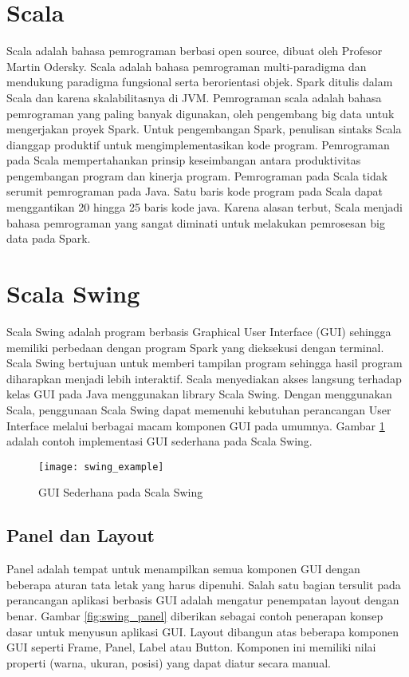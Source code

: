 \section{Scala}
Scala adalah bahasa pemrograman berbasi open source, dibuat oleh Profesor Martin Odersky. Scala adalah bahasa pemrograman multi-paradigma dan mendukung paradigma fungsional serta berorientasi objek. Spark ditulis dalam Scala dan karena skalabilitasnya di JVM. Pemrograman scala adalah bahasa pemrograman yang paling banyak digunakan, oleh pengembang big data untuk mengerjakan proyek Spark. Untuk pengembangan Spark, penulisan sintaks Scala dianggap produktif untuk mengimplementasikan kode program. Pemrograman pada Scala mempertahankan prinsip keseimbangan antara produktivitas pengembangan program dan kinerja program. Pemrograman pada Scala tidak serumit pemrograman pada Java. Satu baris kode program pada Scala dapat menggantikan 20 hingga 25 baris kode java. Karena alasan terbut, Scala menjadi bahasa pemrograman yang sangat diminati untuk melakukan pemrosesan big data pada Spark.



\section{Scala Swing} 
Scala Swing adalah program berbasis Graphical User Interface (GUI) sehingga memiliki perbedaan dengan program Spark yang dieksekusi dengan terminal. Scala Swing bertujuan untuk memberi tampilan program sehingga hasil program diharapkan menjadi lebih interaktif. Scala menyediakan akses langsung terhadap kelas GUI pada Java menggunakan library Scala Swing.  Dengan menggunakan Scala, penggunaan Scala Swing dapat memenuhi kebutuhan perancangan User Interface melalui berbagai macam komponen GUI pada umumnya. Gambar \ref{fig:swing_example} adalah contoh implementasi GUI sederhana pada Scala Swing.

\begin{figure}[H]
	\centering
	\texttt{[image: swing\_example]}
	\caption{GUI Sederhana pada Scala Swing}
	\label{fig:swing_example}
\end{figure}


\subsection{Panel dan Layout}
Panel adalah tempat untuk menampilkan semua komponen GUI dengan beberapa aturan tata letak yang harus dipenuhi. Salah satu bagian tersulit pada perancangan aplikasi berbasis GUI adalah mengatur penempatan layout dengan benar. Gambar \ref{fig:swing_panel} diberikan sebagai contoh penerapan konsep dasar untuk menyusun aplikasi GUI. Layout dibangun atas beberapa komponen GUI seperti Frame, Panel, Label atau Button. Komponen ini memiliki nilai properti (warna, ukuran, posisi) yang dapat diatur secara manual.

